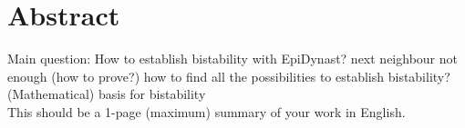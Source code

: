 \chapter{Abstract}
Main question: How to establish bistability with EpiDynast?
	next neighbour not enough (how to prove?)
	how to find all the possibilities to establish bistability?
		(Mathematical) basis for bistability\\

This should be a 1-page (maximum) summary of your work in English.

